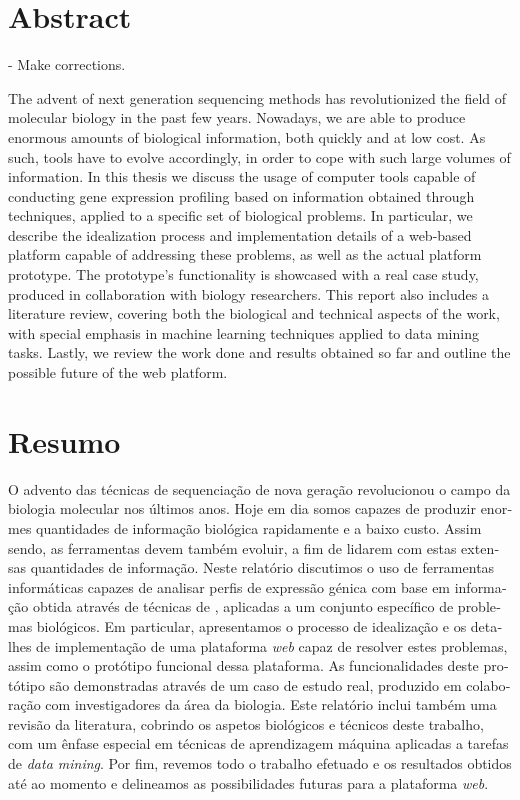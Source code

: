 \chapter*{Abstract}

\begin{Notes}
- Make corrections.\\
\end{Notes}

The advent of next generation sequencing methods has revolutionized the field of
molecular biology in the past few years. Nowadays, we are able to produce
enormous amounts of biological information, both quickly and at low cost. As
such, tools have to evolve accordingly, in order to cope with such large volumes
of information. In this thesis we discuss the usage of computer tools capable of
conducting gene expression profiling based on information obtained through
\rnaseq{} techniques, applied to a specific set of biological problems. In
particular, we describe the idealization process and implementation details of a
web-based platform capable of addressing these problems, as well as the actual
platform prototype. The prototype's functionality is showcased with a real case
study, produced in collaboration with biology researchers. This report also
includes a literature review, covering both the biological and technical aspects
of the work, with special emphasis in machine learning techniques applied to
data mining tasks. Lastly, we review the work done and results obtained so far
and outline the possible future of the web platform.

\chapter*{Resumo}

\begin{otherlanguage}{portuguese}
O advento das técnicas de sequenciação de nova geração revolucionou o campo da
biologia molecular nos últimos anos. Hoje em dia somos capazes de produzir
enormes quantidades de informação biológica rapidamente e a baixo custo. Assim
sendo, as ferramentas devem também evoluir, a fim de lidarem com estas extensas
quantidades de informação. Neste relatório discutimos o uso de ferramentas
informáticas capazes de analisar perfis de expressão génica com base em
informação obtida através de técnicas de \textit{\rnaseq{}}, aplicadas a um
conjunto específico de problemas biológicos. Em particular, apresentamos o
processo de idealização e os detalhes de implementação de uma plataforma
\textit{web} capaz de resolver estes problemas, assim como o protótipo funcional
dessa plataforma. As funcionalidades deste protótipo são demonstradas através de
um caso de estudo real, produzido em colaboração com investigadores da área da
biologia. Este relatório inclui também uma revisão da literatura, cobrindo os
aspetos biológicos e técnicos deste trabalho, com um ênfase especial em técnicas
de aprendizagem máquina aplicadas a tarefas de \textit{data mining}. Por fim,
revemos todo o trabalho efetuado e os resultados obtidos até ao momento e
delineamos as possibilidades futuras para a plataforma \textit{web}.
\end{otherlanguage}
